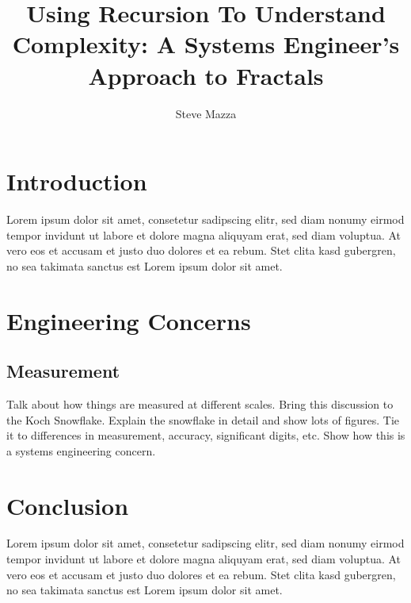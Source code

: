 \documentclass[jou,apacite]{apa6}
\title{Using Recursion To Understand Complexity: A Systems Engineer's Approach to Fractals}
\author{Steve Mazza}
\affiliation{Naval Postgraduate School}
\begin{document}
\maketitle    
                        
\section{Introduction}
Lorem ipsum dolor sit amet, consetetur sadipscing elitr, sed diam nonumy eirmod
tempor invidunt ut labore et dolore magna aliquyam erat, sed diam voluptua. At
vero eos et accusam et justo duo dolores et ea rebum. Stet clita kasd gubergren,
no sea takimata sanctus est Lorem ipsum dolor sit amet.~\cite[page 112]{Axelrod}

\section{Engineering Concerns}
\subsection{Measurement}
Talk about how things are measured at different scales.  Bring this discussion to the Koch Snowflake.  Explain the snowflake in detail and show lots of figures.  Tie it to differences in measurement, accuracy, significant digits, etc.  Show how this is a systems engineering concern.

\section{Conclusion}
Lorem ipsum dolor sit amet, consetetur sadipscing elitr, sed diam nonumy eirmod
tempor invidunt ut labore et dolore magna aliquyam erat, sed diam voluptua. At
vero eos et accusam et justo duo dolores et ea rebum. Stet clita kasd gubergren,
no sea takimata sanctus est Lorem ipsum dolor sit amet.


\end{document}
